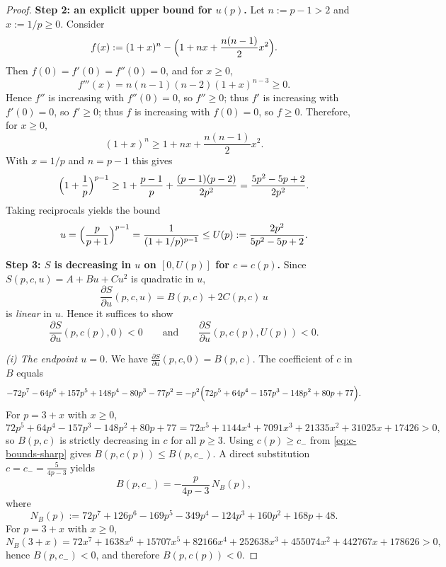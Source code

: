 \documentclass[11pt]{article}
\theoremstyle{definition}
\newcommand{\1}{\mathbf{1}}
\begin{document}
\begin{proof}
\medskip
\noindent\textbf{Step 2: an explicit upper bound for $u(p)$.}
Let $n:=p-1>2$ and $x:=1/p\ge 0$. Consider
\[
f(x):=(1+x)^n-\Bigl(1+nx+\frac{n(n-1)}{2}x^2\Bigr).
\]
Then $f(0)=f'(0)=f''(0)=0$, and for $x\ge0$,
\[
f'''(x)=n(n-1)(n-2)(1+x)^{n-3}\ge 0.
\]
Hence $f''$ is increasing with $f''(0)=0$, so $f''\ge0$; thus $f'$ is increasing
with $f'(0)=0$, so $f'\ge0$; thus $f$ is increasing with $f(0)=0$, so $f\ge0$.
Therefore, for $x\ge0$,
\[
(1+x)^n\ge 1+nx+\frac{n(n-1)}{2}x^2.
\]
With $x=1/p$ and $n=p-1$ this gives
\[
\Bigl(1+\frac1p\Bigr)^{p-1}
\ge
1+\frac{p-1}{p}+\frac{(p-1)(p-2)}{2p^2}
=
\frac{5p^2-5p+2}{2p^2}.
\]
Taking reciprocals yields the bound
\begin{equation}\label{eq:u-upper}
u=\Bigl(\frac{p}{p+1}\Bigr)^{p-1}
=\frac{1}{(1+1/p)^{p-1}}
\le
U(p):=\frac{2p^2}{5p^2-5p+2}.
\end{equation}

\medskip
\noindent\textbf{Step 3: $S$ is decreasing in $u$ on $[0,U(p)]$ for $c=c(p)$.}
Since $S(p,c,u)=A+B u+C u^2$ is quadratic in $u$,
\[
\frac{\partial S}{\partial u}(p,c,u)=B(p,c)+2C(p,c)\,u
\]
is \emph{linear} in $u$. Hence it suffices to show
\begin{equation}\label{eq:Su-endpoints}
\frac{\partial S}{\partial u}(p,c(p),0)<0
\qquad\text{and}\qquad
\frac{\partial S}{\partial u}(p,c(p),U(p))<0.
\end{equation}

\smallskip
\emph{(i) The endpoint $u=0$.}
We have $\frac{\partial S}{\partial u}(p,c,0)=B(p,c)$. The coefficient of $c$ in $B$
equals
\[
-72p^7-64p^6+157p^5+148p^4-80p^3-77p^2
=
-p^2\Bigl(72p^5+64p^4-157p^3-148p^2+80p+77\Bigr).
\]
For $p=3+x$ with $x\ge0$,
\[
72p^5+64p^4-157p^3-148p^2+80p+77
=
72x^5+1144x^4+7091x^3+21335x^2+31025x+17426>0,
\]
so $B(p,c)$ is strictly decreasing in $c$ for all $p\ge3$.
Using $c(p)\ge c_-$ from \eqref{eq:c-bounds-sharp} gives $B(p,c(p))\le B(p,c_-)$.
A direct substitution $c=c_-=\frac{5}{4p-3}$ yields
\[
B(p,c_-)=
-\frac{p}{4p-3}\,N_B(p),
\]
where
\[
N_B(p):=72p^7+126p^6-169p^5-349p^4-124p^3+160p^2+168p+48.
\]
For $p=3+x$ with $x\ge0$,
\[
N_B(3+x)=72x^7+1638x^6+15707x^5+82166x^4+252638x^3+455074x^2+442767x+178626>0,
\]
hence $B(p,c_-)\!<0$, and therefore $B(p,c(p))<0$.


\end{proof}
\end{document}
